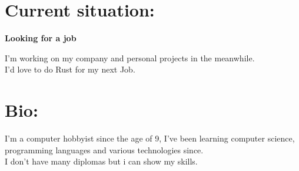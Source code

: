 \documentclass[a4paper,10pt]{article}
\begin{document}
%
%
%
\hfill
\begin{adjustbox}{valign=t}
\begin{minipage}{0.05\textwidth} %
\MyVerticalRule  %
\end{minipage}
\end{adjustbox}
\hfill
%
\begin{adjustbox}{valign=t}
\begin{minipage}{0.6\textwidth} %
\section*{Current situation:}
\begin{description}
\raggedright
\item[\normalfont \textcolor{ColorOne}{August. 2023 -- Now.}] \textbf{Looking for a job}\\ \medskip

	\begin{spacing}{1.0}
		I'm working on my company and personal projects in the meanwhile.\\
		I'd love to do Rust for my next Job.
	\end{spacing}

\vspace{-0.9\baselineskip}
\end{description}

\section*{Bio:}
\begin{spacing}{1.0}

\vspace{-0.6\baselineskip}

\hspace{5mm} I'm a computer hobbyist since the age of 9, I've been learning computer science,
programming languages and various technologies since.\\
I don't have many diplomas but i can show my skills.
\end{spacing}
\vspace{-0.8\baselineskip}

\end{minipage}
\end{adjustbox}
\end{document}
